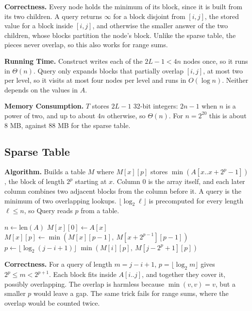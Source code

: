 \documentclass{article}
\theoremstyle{definition}
\begin{document}
\textbf{Correctness.} Every node holds the minimum of its block, since it is built from its two children. A query returns $\infty$ for a block disjoint from $[i, j]$, the stored value for a block inside $[i, j]$, and otherwise the smaller answer of the two children, whose blocks partition the
node's block. Unlike the sparse table, the pieces never overlap, so this also works for range sums.
 
\textbf{Running Time.} Construct writes each of the $2L - 1 < 4n$ nodes once, so it runs in $\Theta(n)$. Query only expands blocks that partially overlap $[i, j]$, at most two per level, so it visits at most four nodes per level and runs in $O(\log n)$. Neither depends on the values in $A$.
 
\textbf{Memory Consumption.} $T$ stores $2L - 1$ 32-bit integers: $2n - 1$ when $n$ is a power of two, and up to about $4n$ otherwise, so $\Theta(n)$. For $n = 2^{20}$ this is about $8$ MB, against $88$ MB for the sparse table.

\subsection{Sparse Table}
\textbf{Algorithm.} Builds a table $M$ where $M[x][p]$ stores $\min(A[x..x + 2^p - 1])$, the block of length $2^p$ starting at $x$. Column $0$ is the array itself, and each later column combines two adjacent blocks from the column before it. A query is the minimum of two overlapping lookups. $\lfloor \log_2 \ell \rfloor$ is precomputed for every length $\ell \leq n$, so Query reads $p$ from a table.
 
\begin{algorithm}[H]
\caption{Sparse Table}
\begin{algorithmic}[H]
  \State $n \gets \mathrm{len}(A)$
    \State $M[x][0] \gets A[x]$
  \EndFor
      \State $M[x][p] \gets \min(M[x][p-1],\ M[x + 2^{p-1}][p-1])$
    \EndFor
  \EndFor
\EndFunction
{}
  \State $p \gets \lfloor \log_2(j - i + 1) \rfloor$
  \State \Return $\min(M[i][p],\ M[j - 2^p + 1][p])$
\EndFunction
\end{algorithmic}
\end{algorithm}
 
\textbf{Correctness.} For a query of length $m = j - i + 1$, $p = \lfloor \log_2 m \rfloor$ gives
$2^p \leq m < 2^{p+1}$. Each block fits inside $A[i..j]$, and together they cover it, possibly
overlapping. The overlap is harmless because $\min(v, v) = v$, but a smaller $p$ would leave a
gap. The same trick fails for range sums, where the overlap would be counted twice.
 
\end{document}
